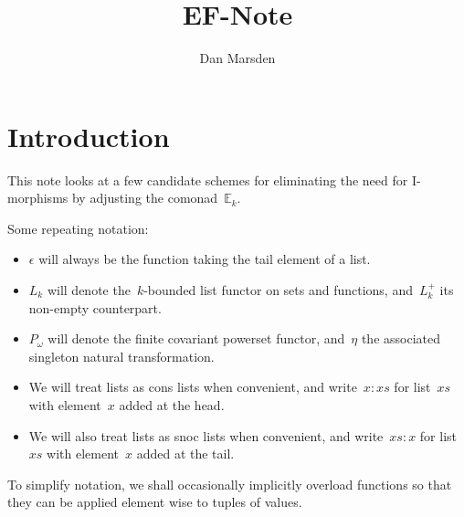 \documentclass{article}
\title{EF-Note}
\author{Dan Marsden}
\theoremstyle{plain}
\theoremstyle{definition}
\theoremstyle{remark}
\numberwithin{theorem}{section}
\begin{document}
\maketitle

\section{Introduction}
This note looks at a few candidate schemes for eliminating the need for I-morphisms by adjusting the comonad~$\mathbb{E}_k$.

Some repeating notation:
\begin{itemize}
    \item $\epsilon$ will always be the function taking the tail element of a list.
    \item $L_k$ will denote the~$k$-bounded list functor on sets and functions, and~$L^+_k$ its non-empty counterpart.
    \item $P_\omega$ will denote the finite covariant powerset functor, and~$\eta$ the associated singleton natural transformation.
    \item We will treat lists as cons lists when convenient, and write~$x:xs$ for list~$xs$ with element~$x$ added at the head.
    \item We will also treat lists as snoc lists when convenient, and write~$xs:x$ for list~$xs$ with element~$x$ added at the tail.
\end{itemize}
To simplify notation, we shall occasionally implicitly overload functions so that they can be applied element wise to tuples of values.
\end{document}
